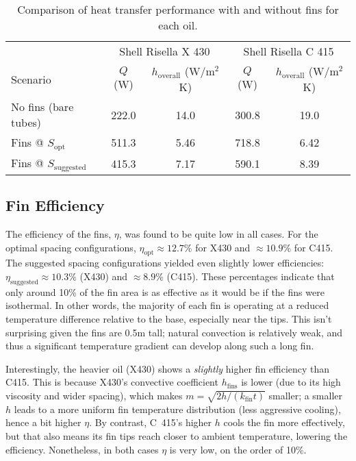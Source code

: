 \documentclass[12pt]{article}
\begin{document}
\begin{table}[h!]
\centering
\caption{Comparison of heat transfer performance with and without fins for each oil.}
\label{tab:performance}
\begin{tabular}{lcccc}
\toprule
& \multicolumn{2}{c}{Shell Risella X 430} & \multicolumn{2}{c}{Shell Risella C 415} \\
\cmidrule(lr){2-3}\cmidrule(lr){4-5}
Scenario & $Q$ (W) & $h_{\text{overall}}$ (W/m$^2$K) & $Q$ (W) & $h_{\text{overall}}$ (W/m$^2$K) \\
\midrule
No fins (bare tubes) & 222.0 & 14.0 & 300.8 & 19.0 \\
Fins @ $S_{\text{opt}}$ & 511.3 & 5.46 & 718.8 & 6.42 \\
Fins @ $S_{\text{suggested}}$ & 415.3 & 7.17 & 590.1 & 8.39 \\
\bottomrule
\end{tabular}
\end{table}

\subsection{Fin Efficiency}
The efficiency of the fins, $\eta$, was found to be quite low in all cases. For the optimal spacing configurations, $\eta_{\text{opt}} \approx 12.7\%$ for X430 and $\approx 10.9\%$ for C415. The suggested spacing configurations yielded even slightly lower efficiencies: $\eta_{\text{suggested}} \approx 10.3\%$ (X430) and $\approx 8.9\%$ (C415). These percentages indicate that only around 10\% of the fin area is as effective as it would be if the fins were isothermal. In other words, the majority of each fin is operating at a reduced temperature difference relative to the base, especially near the tips. This isn’t surprising given the fins are 0.5m tall; natural convection is relatively weak, and thus a significant temperature gradient can develop along such a long fin.

Interestingly, the heavier oil (X430) shows a \emph{slightly} higher fin efficiency than C415. This is because X430’s convective coefficient $h_{\text{fins}}$ is lower (due to its high viscosity and wider spacing), which makes $m = \sqrt{2h/(k_{\text{fin}} t)}$ smaller; a smaller $h$ leads to a more uniform fin temperature distribution (less aggressive cooling), hence a bit higher $\eta$. By contrast, C~415’s higher $h$ cools the fin more effectively, but that also means its fin tips reach closer to ambient temperature, lowering the efficiency. Nonetheless, in both cases $\eta$ is very low, on the order of 10\%.
\end{document}
